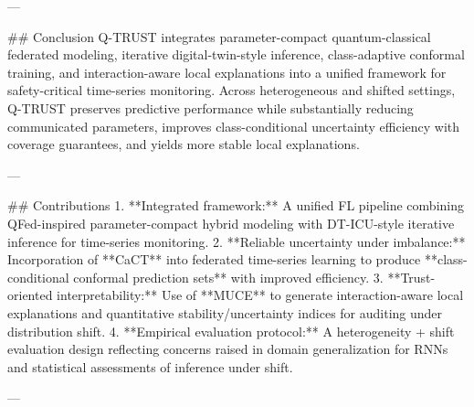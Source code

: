 ---

## Conclusion
Q-TRUST integrates parameter-compact quantum-classical federated modeling, iterative digital-twin-style inference, class-adaptive conformal training, and interaction-aware local explanations into a unified framework for safety-critical time-series monitoring. Across heterogeneous and shifted settings, Q-TRUST preserves predictive performance while substantially reducing communicated parameters, improves class-conditional uncertainty efficiency with coverage guarantees, and yields more stable local explanations.

---

## Contributions
1. **Integrated framework:** A unified FL pipeline combining QFed-inspired parameter-compact hybrid modeling with DT-ICU-style iterative inference for time-series monitoring.
2. **Reliable uncertainty under imbalance:** Incorporation of **CaCT** into federated time-series learning to produce **class-conditional conformal prediction sets** with improved efficiency.
3. **Trust-oriented interpretability:** Use of **MUCE** to generate interaction-aware local explanations and quantitative stability/uncertainty indices for auditing under distribution shift.
4. **Empirical evaluation protocol:** A heterogeneity + shift evaluation design reflecting concerns raised in domain generalization for RNNs and statistical assessments of inference under shift.

---